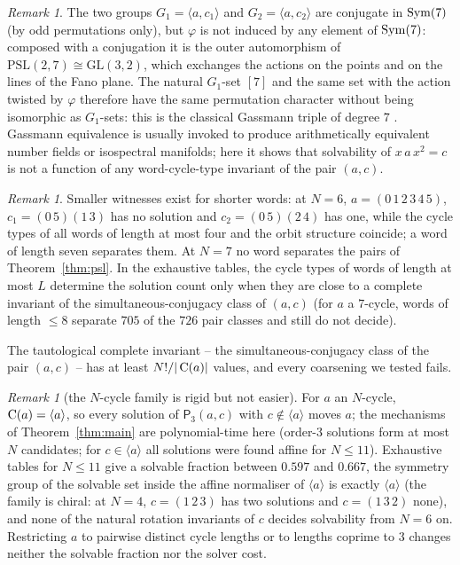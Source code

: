 \documentclass[preprint,12pt]{elsarticle}
\theoremstyle{definition}\newtheorem{defi}[thm]{Definition}\newtheorem{prob}[thm]{Problem}\newtheorem{obs}[thm]{Observation}
\theoremstyle{remark}\newtheorem{rem}[thm]{Remark}
\newcommand{\Pthree}{\mathsf{P}_3}\newcommand{\Conj}[1]{\mathsf{Conj}_{#1}}\newcommand{\Dzero}{\Conj{3}}\newcommand{\TR}{T_{\mathcal R}}
\begin{document}
\begin{rem}
The two groups $G_1=\langle a,c_1\rangle$ and $G_2=\langle a,c_2\rangle$ are conjugate in $\operatorname{Sym}(7)$ (by odd permutations only), but
$\varphi$ is not induced by any element of $\operatorname{Sym}(7)$: composed with a conjugation it is the outer automorphism of $\mathrm{PSL}(2,7)\cong
\mathrm{GL}(3,2)$, which exchanges the actions on the points and on the lines of the Fano plane. The natural $G_1$-set $[7]$ and the same set with the action twisted by $\varphi$ therefore have the same permutation character without being isomorphic as $G_1$-sets: this is the classical Gassmann triple of degree $7$ \cite{perlis1977,sunada1985,kammeyer2024gassmann}. Gassmann equivalence is usually invoked to produce arithmetically equivalent number fields or isospectral manifolds;
here it shows that solvability of $x\,a\,x^{2}=c$ is not a function of any word-cycle-type invariant of the pair $(a,c)$.
\end{rem}
\begin{rem}
Smaller witnesses exist for shorter words: at $N=6$, $a=(0\,1\,2\,3\,4\,5)$, $c_1=(0\,5)(1\,3)$ has no solution and $c_2=(0\,5)(2\,4)$ has one, while the cycle types of all words of length at most four and the orbit structure coincide; a word of length seven separates them. At $N=7$ no word separates the pairs of Theorem~\ref{thm:psl}. In the exhaustive tables, the cycle types of words of length at most $L$ determine the solution count only when they are close to a complete invariant of the simultaneous-conjugacy class of $(a,c)$ (for $a$ a $7$-cycle, words of length $\le8$ separate $705$ of the $726$ pair classes and still do not decide).
\end{rem}
The tautological complete invariant -- the simultaneous-conjugacy class of the pair $(a,c)$ -- has at least $N!/|\operatorname{C}(a)|$ values, and every coarsening we tested fails.

\begin{rem}[the $N$-cycle family is rigid but not easier]
For $a$ an $N$-cycle, $\operatorname{C}(a)=\langle a\rangle$, so every solution of $\Pthree(a,c)$ with $c\notin\langle a\rangle$ moves $a$; the mechanisms of Theorem~\ref{thm:main} are polynomial-time here (order-$3$ solutions form at most $N$ candidates; for $c\in\langle a\rangle$ all solutions were found
affine for $N\le11$). Exhaustive tables for $N\le11$ give a solvable fraction between $0.597$ and $0.667$, the symmetry group of the solvable
set inside the affine normaliser of $\langle a\rangle$ is exactly $\langle a\rangle$ (the family is chiral: at $N=4$, $c=(1\,2\,3)$ has two solutions
and $c=(1\,3\,2)$ none), and none of the natural rotation invariants of $c$ decides solvability from $N=6$ on. Restricting $a$ to pairwise
distinct cycle lengths or to lengths coprime to $3$ changes neither the solvable fraction nor the solver cost.
\end{rem}
\end{document}
